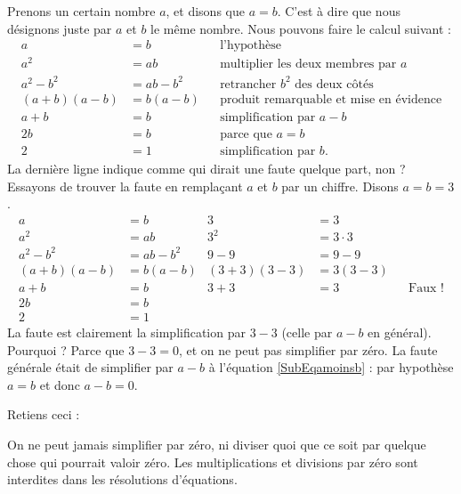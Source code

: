 \documentclass{article}
\begin{document}
Prenons un certain nombre $a$, et disons que $a=b$. C'est à dire que nous désignons juste par $a$ et $b$ le même nombre. Nous pouvons faire le calcul suivant :
\begin{subequations}
\begin{align}
a&=b&&\text{l'hypothèse}\\
a^{2}&=ab&&\text{multiplier les deux membres par $a$}\\
a^{2}-b^{2}&=ab-b^{2}&&\text{retrancher $b^{2}$ des deux côtés}\\
(a+b)(a-b)&=b(a-b)&&\text{produit remarquable et mise en évidence}\\
a+b&=b&&\text{simplification par $a-b$}  \label{SubEqamoinsb}\\
2b&=b&&\text{parce que $a=b$}\\
2&=1&&\text{simplification par $b$}.
\end{align}
\end{subequations}
La dernière ligne indique comme qui dirait une faute quelque part, non ? Essayons de trouver la faute en remplaçant $a$ et $b$ par un chiffre. Disons $a=b=3$.
\begin{subequations}
\begin{align}
a&=b&3&=3\\
a^{2}&=ab&3^{2}&=3\cdot 3\\
a^{2}-b^{2}&=ab-b^{2}&9-9&=9-9\\
(a+b)(a-b)&=b(a-b)&(3+3)(3-3)&=3(3-3)\\
a+b&=b&3+3&=3&&\text{Faux !}\\
2b&=b&&\\
2&=1&&
\end{align}
\end{subequations}
La faute est clairement la simplification par $3-3$ (celle par $a-b$ en général). Pourquoi ? Parce que $3-3=0$, et on ne peut pas simplifier par zéro. La faute générale était de simplifier par $a-b$ à l'équation \eqref{SubEqamoinsb} : par hypothèse $a=b$ et donc $a-b=0$.

Retiens ceci :

\setcounter{numloiphyz}{0}		%
\begin{loiphyz}  \label{PgLoiUnZero}
On ne peut jamais simplifier par zéro, ni diviser quoi que ce soit par quelque chose qui pourrait valoir zéro. Les multiplications et divisions par zéro sont interdites dans les résolutions d'équations.
\end{loiphyz}
\end{document}
